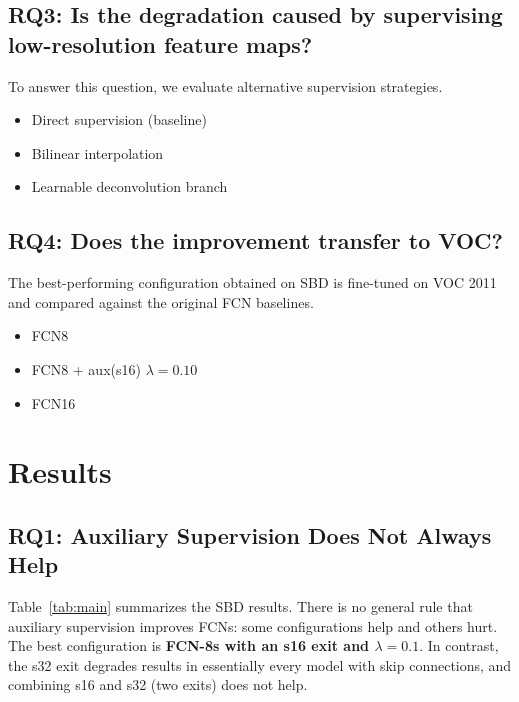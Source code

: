 \documentclass{article}
\begin{document}
    \subsection{RQ3: Is the degradation caused by supervising low-resolution feature maps?}

    To answer this question, we evaluate alternative supervision strategies.

    \begin{itemize}
        \item Direct supervision (baseline)
        \item Bilinear interpolation
        \item Learnable deconvolution branch
    \end{itemize}

    \subsection{RQ4: Does the improvement transfer to VOC?}

    The best-performing configuration obtained on SBD is fine-tuned on
    VOC 2011 and compared against the original FCN baselines.

    \begin{itemize}
        \item FCN8
        \item FCN8 + aux(s16) $\lambda=0.10$
        \item FCN16
    \end{itemize}


\section{Results}
\label{sec:results}

    \subsection{RQ1: Auxiliary Supervision Does Not Always Help}

        Table~\ref{tab:main} summarizes the SBD results. There is no general rule that
    auxiliary supervision improves FCNs: some configurations help and others hurt. The best configuration is \textbf{FCN-8s with an s16 exit and $\lambda=0.1$}. In contrast, the s32 exit degrades results in essentially every model with skip connections, and combining s16 and s32 (two exits) does not help.
\end{document}
